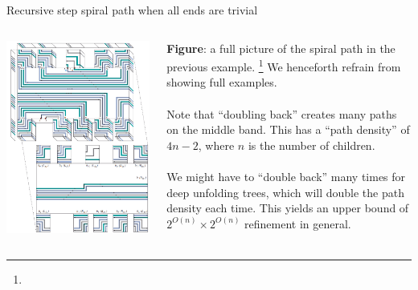 \documentclass{beamer}
\theoremstyle{plain}
\begin{document}
  \begin{frame}{Recursive step spiral path when all ends are trivial}
    \begin{columns}
      \begin{column}{.5\textwidth}
        \includegraphics[height=.8\textheight]{./figs/Recursive_step_example_capped.png}
      \end{column}
      \begin{column}{.5\textwidth}
        \footnotesize \textbf{Figure}: a full picture of the spiral path in the previous example.
        \footnote[frame]{}
        We henceforth refrain from showing full examples.\\
        \;\\
        \pause Note that ``doubling back'' creates many paths on the middle band.
        This has a ``path density'' of $4n - 2$, where $n$ is the number of children.\\
        \;\\
        \pause We might have to ``double back'' many times for deep unfolding trees, which will double the path density each time.
        This yields an upper bound of $2^{O(n)} \times 2^{O(n)}$ refinement in general.
      \end{column}
    \end{columns}
  \end{frame}
\end{document}
